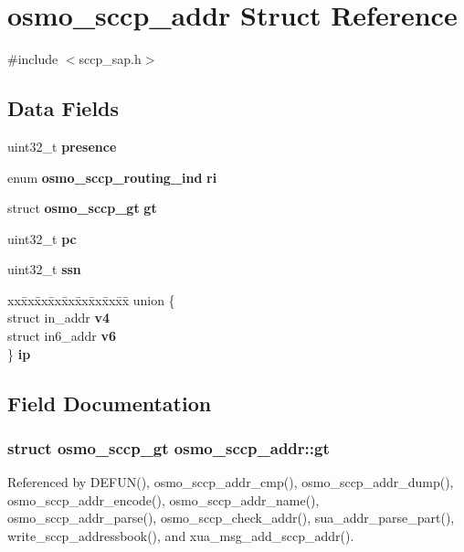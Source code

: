 \section{osmo\+\_\+sccp\+\_\+addr Struct Reference}
\label{structosmo__sccp__addr}


{\ttfamily \#include $<$sccp\+\_\+sap.\+h$>$}

\subsection*{Data Fields}
\begin{DoxyCompactItemize}
\item 
uint32\+\_\+t {\bf presence}
\item 
enum {\bf osmo\+\_\+sccp\+\_\+routing\+\_\+ind} {\bf ri}
\item 
struct {\bf osmo\+\_\+sccp\+\_\+gt} {\bf gt}
\item 
uint32\+\_\+t {\bf pc}
\item 
uint32\+\_\+t {\bf ssn}
\item 
\begin{tabbing}
xx\=xx\=xx\=xx\=xx\=xx\=xx\=xx\=xx\=\kill
union \{\\
\>struct in\_addr {\bf v4}\\
\>struct in6\_addr {\bf v6}\\
\} {\bf ip}\\

\end{tabbing}\end{DoxyCompactItemize}


\subsection{Field Documentation}
\subsubsection[{gt}]{\setlength{\rightskip}{0pt plus 5cm}struct {\bf osmo\+\_\+sccp\+\_\+gt} osmo\+\_\+sccp\+\_\+addr\+::gt}\label{structosmo__sccp__addr_a9db5ad9cb9b30be37687ce5452dcdfe5}


Referenced by D\+E\+F\+U\+N(), osmo\+\_\+sccp\+\_\+addr\+\_\+cmp(), osmo\+\_\+sccp\+\_\+addr\+\_\+dump(), osmo\+\_\+sccp\+\_\+addr\+\_\+encode(), osmo\+\_\+sccp\+\_\+addr\+\_\+name(), osmo\+\_\+sccp\+\_\+addr\+\_\+parse(), osmo\+\_\+sccp\+\_\+check\+\_\+addr(), sua\+\_\+addr\+\_\+parse\+\_\+part(), write\+\_\+sccp\+\_\+addressbook(), and xua\+\_\+msg\+\_\+add\+\_\+sccp\+\_\+addr().

